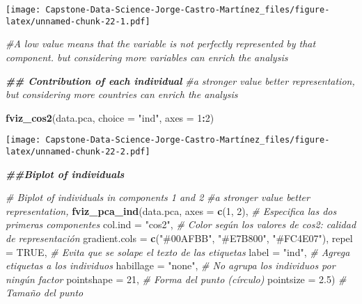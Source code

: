 \documentclass[
]{article}
\newenvironment{Shaded}{\begin{snugshade}}{\end{snugshade}}
\newcommand{\AttributeTok}[1]{\textcolor[rgb]{0.13,0.29,0.53}{#1}}
\newcommand{\CommentTok}[1]{\textcolor[rgb]{0.56,0.35,0.01}{\textit{#1}}}
\newcommand{\ConstantTok}[1]{\textcolor[rgb]{0.56,0.35,0.01}{#1}}
\newcommand{\DecValTok}[1]{\textcolor[rgb]{0.00,0.00,0.81}{#1}}
\newcommand{\DocumentationTok}[1]{\textcolor[rgb]{0.56,0.35,0.01}{\textbf{\textit{#1}}}}
\newcommand{\FloatTok}[1]{\textcolor[rgb]{0.00,0.00,0.81}{#1}}
\newcommand{\FunctionTok}[1]{\textcolor[rgb]{0.13,0.29,0.53}{\textbf{#1}}}
\newcommand{\NormalTok}[1]{#1}
\newcommand{\SpecialCharTok}[1]{\textcolor[rgb]{0.81,0.36,0.00}{\textbf{#1}}}
\newcommand{\StringTok}[1]{\textcolor[rgb]{0.31,0.60,0.02}{#1}}
\begin{document}
\texttt{[image: Capstone-Data-Science-Jorge-Castro-Martínez\_files/figure-latex/unnamed-chunk-22-1.pdf]}

\begin{Shaded}
\begin{Highlighting}[]
\CommentTok{\#A low value means that the variable is not perfectly represented by that component. but considering more variables can enrich the analysis}

\DocumentationTok{\#\# Contribution of each individual}
\CommentTok{\#a stronger value better representation, but considering more countries can enrich the analysis}

\FunctionTok{fviz\_cos2}\NormalTok{(data.pca, }\AttributeTok{choice =} \StringTok{"ind"}\NormalTok{, }\AttributeTok{axes =} \DecValTok{1}\SpecialCharTok{:}\DecValTok{2}\NormalTok{)}
\end{Highlighting}
\end{Shaded}

\texttt{[image: Capstone-Data-Science-Jorge-Castro-Martínez\_files/figure-latex/unnamed-chunk-22-2.pdf]}

\begin{Shaded}
\begin{Highlighting}[]
\DocumentationTok{\#\#Biplot of individuals}


\CommentTok{\# Biplot of individuals in components 1 and 2}
\CommentTok{\#a stronger value better representation,}
\FunctionTok{fviz\_pca\_ind}\NormalTok{(data.pca,}
             \AttributeTok{axes =} \FunctionTok{c}\NormalTok{(}\DecValTok{1}\NormalTok{, }\DecValTok{2}\NormalTok{),          }\CommentTok{\# Especifica las dos primeras componentes}
             \AttributeTok{col.ind =} \StringTok{"cos2"}\NormalTok{,        }\CommentTok{\# Color según los valores de cos2: calidad de representación}
             \AttributeTok{gradient.cols =} \FunctionTok{c}\NormalTok{(}\StringTok{"\#00AFBB"}\NormalTok{, }\StringTok{"\#E7B800"}\NormalTok{, }\StringTok{"\#FC4E07"}\NormalTok{),}
             \AttributeTok{repel =} \ConstantTok{TRUE}\NormalTok{,            }\CommentTok{\# Evita que se solape el texto de las etiquetas}
             \AttributeTok{label =} \StringTok{"ind"}\NormalTok{,           }\CommentTok{\# Agrega etiquetas a los individuos}
             \AttributeTok{habillage =} \StringTok{"none"}\NormalTok{,      }\CommentTok{\# No agrupa los individuos por ningún factor}
             \AttributeTok{pointshape =} \DecValTok{21}\NormalTok{,         }\CommentTok{\# Forma del punto (círculo)}
             \AttributeTok{pointsize =} \FloatTok{2.5}\NormalTok{)         }\CommentTok{\# Tamaño del punto}
\end{Highlighting}
\end{Shaded}
\end{document}
